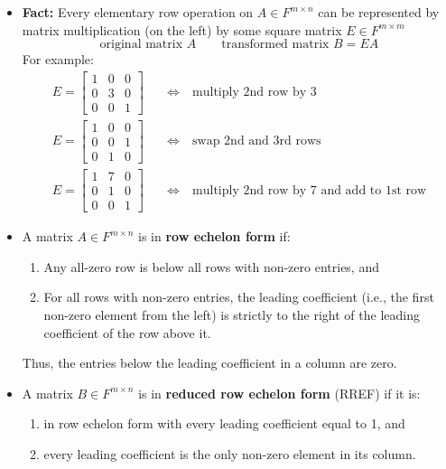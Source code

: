 \documentclass[11pt,twoside]{report}
\begin{document}
\begin{itemize}
\item \textbf{Fact:}  Every elementary row operation on $A \in F^{m \times n}$ can be represented by matrix multiplication (on the left) by some square matrix $E \in F^{m \times m}$
\[
\text{original matrix $A$}  \qquad  \text{transformed matrix $B = EA$}
\]
For example: 
\begin{align*}
E =  \begin{bmatrix}
1 & 0 & 0 \\
0 & 3 & 0 \\
0 & 0 & 1 
\end{bmatrix} \quad &\iff \quad \text{multiply 2nd row by 3} \\
E =  \begin{bmatrix}
1 & 0 & 0 \\
0 & 0 & 1 \\
0 & 1 & 0  
\end{bmatrix} \quad &\iff \quad \text{swap 2nd and 3rd rows} \\
E =  \begin{bmatrix}
1 & 7 & 0 \\
0 & 1 & 0 \\
0 & 0 & 1  
\end{bmatrix} \quad &\iff \quad \text{multiply 2nd row by 7 and add to 1st row} 
\end{align*}


  
  \item A matrix $A \in F^{m\times n}$ is in \textbf{row echelon form} if:
\begin{enumerate}
\item Any all-zero row is below all rows with non-zero entries, and
\item For all rows with non-zero entries, the leading coefficient (i.e., the first non-zero element from the left) is strictly to the right of the leading coefficient of the row above it.
\end{enumerate}
Thus, the entries below the leading coefficient in a column are zero. %


\item  A matrix $B \in F^{m\times n}$ is in \textbf{reduced row echelon form} (RREF) if it is:
\begin{enumerate}
\item in row echelon form with every leading coefficient equal to 1, and
\item every leading coefficient is the only non-zero element in its column.
\end{enumerate}



\end{itemize}
\end{document}
